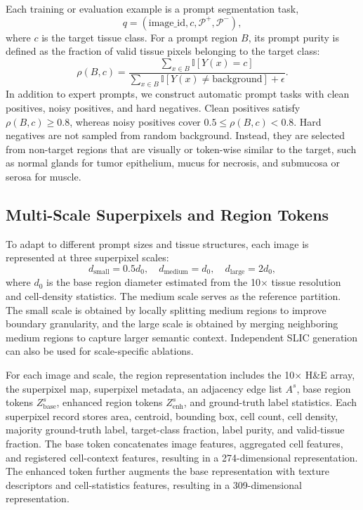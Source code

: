 \documentclass[letterpaper]{article} %
\begin{document}
Each training or evaluation example is a prompt segmentation task,
\begin{equation}
    q=(\mathrm{image\_id}, c, \mathcal{P}^{+}, \mathcal{P}^{-}),
\end{equation}
where $c$ is the target tissue class. For a prompt region $B$, its prompt purity is defined as the fraction of valid tissue pixels belonging to the target class:
\begin{equation}
    \rho(B,c)=
    \frac{\sum_{x\in B}\mathbb{I}[Y(x)=c]}
    {\sum_{x\in B}\mathbb{I}[Y(x)\neq \mathrm{background}] + \epsilon}.
\end{equation}
In addition to expert prompts, we construct automatic prompt tasks with clean positives, noisy positives, and hard negatives. Clean positives satisfy $\rho(B,c)\geq0.8$, whereas noisy positives cover $0.5\leq\rho(B,c)<0.8$. Hard negatives are not sampled from random background. Instead, they are selected from non-target regions that are visually or token-wise similar to the target, such as normal glands for tumor epithelium, mucus for necrosis, and submucosa or serosa for muscle.

\subsection{Multi-Scale Superpixels and Region Tokens}

To adapt to different prompt sizes and tissue structures, each image is represented at three superpixel scales:
\begin{equation}
    d_{\mathrm{small}}=0.5d_{0}, \quad
    d_{\mathrm{medium}}=d_{0}, \quad
    d_{\mathrm{large}}=2d_{0},
\end{equation}
where $d_{0}$ is the base region diameter estimated from the 10$\times$ tissue resolution and cell-density statistics. The medium scale serves as the reference partition. The small scale is obtained by locally splitting medium regions to improve boundary granularity, and the large scale is obtained by merging neighboring medium regions to capture larger semantic context. Independent SLIC generation can also be used for scale-specific ablations.

For each image and scale, the region representation includes the 10$\times$ H\&E array, the superpixel map, superpixel metadata, an adjacency edge list $A^s$, base region tokens $Z_{\mathrm{base}}^s$, enhanced region tokens $Z_{\mathrm{enh}}^s$, and ground-truth label statistics. Each superpixel record stores area, centroid, bounding box, cell count, cell density, majority ground-truth label, target-class fraction, label purity, and valid-tissue fraction. The base token concatenates image features, aggregated cell features, and registered cell-context features, resulting in a 274-dimensional representation. The enhanced token further augments the base representation with texture descriptors and cell-statistics features, resulting in a 309-dimensional representation.
\end{document}
